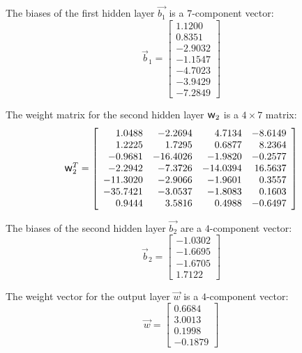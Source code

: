 \documentclass[algorithms,article,accept,pdftex,oneauthors]{Definitions/mdpi}
\DeclareRobustCommand{\w}{\mbox{\large\ensuremath{\mathsf{w}}}}
\begin{document}
The biases of the first hidden layer $\overrightarrow{b_1}$ is a $7$-component vector:
\begin{equation*}
\overrightarrow{b}_1 = \left[
\begin{array}{r}
	1.1200  \\
	0.8351  \\
	-2.9032 \\
	-1.1547 \\
	-4.7023 \\
	-3.9429 \\
	-7.2849
\end{array}\right]
\end{equation*}

The weight matrix for the second hidden layer $\w_2$ is a $4\times7$ matrix:
\begin{equation*}
\w_2^T = \left[
\begin{array}{rrrr}
	1.0488   & -2.2694  & 4.7134   & -8.6149 \\
	1.2225   & 1.7295   & 0.6877   & 8.2364  \\
	-0.9681  & -16.4026 & -1.9820  & -0.2577 \\
	-2.2942  & -7.3726  & -14.0394 & 16.5637 \\
	-11.3020 & -2.9066  & -1.9601  & 0.3557  \\
	-35.7421 & -3.0537  & -1.8083  & 0.1603  \\
	0.9444   & 3.5816   & 0.4988   & -0.6497
\end{array}\right]
\end{equation*}

The biases of the second hidden layer $\overrightarrow{b_2}$ are a $4$-component vector:
\begin{equation*}
\overrightarrow{b}_2 = \left[
\begin{array}{r}
	-1.0302 \\
	-1.6695 \\
	-1.6705 \\
	1.7122
\end{array}\right]
\end{equation*}

The weight vector for the output layer $\overrightarrow{w}$ is a $4$-component vector:
\begin{equation*}
\overrightarrow{w} = \left[
\begin{array}{r}
	0.6684  \\
	3.0013  \\
	0.1998  \\
	-0.1879
\end{array}\right]
\end{equation*}
\end{document}
